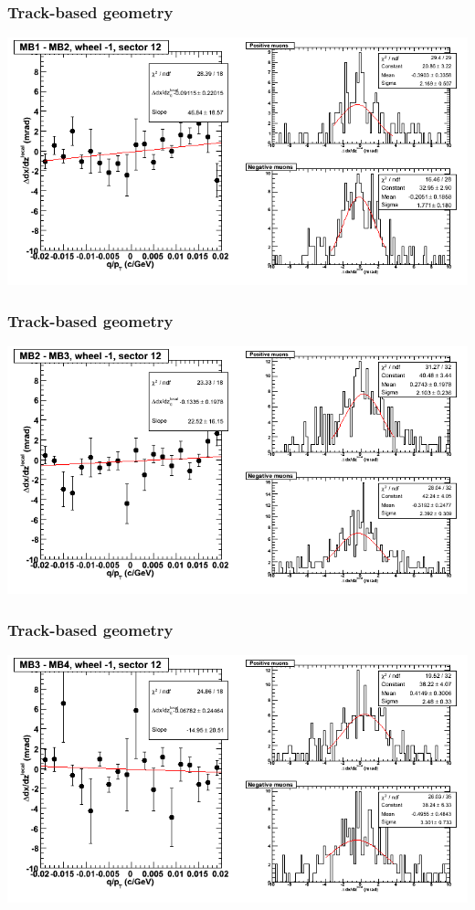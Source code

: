 \documentclass[compress]{beamer}
\begin{document}
\begin{frame}
\frametitle{Track-based geometry}
\includegraphics[width=\linewidth]{NOV4_segdiffs/dt13_slope_B_12_12.png}
\end{frame}

\begin{frame}
\frametitle{Track-based geometry}
\includegraphics[width=\linewidth]{NOV4_segdiffs/dt13_slope_B_12_23.png}
\end{frame}

\begin{frame}
\frametitle{Track-based geometry}
\includegraphics[width=\linewidth]{NOV4_segdiffs/dt13_slope_B_12_34.png}
\end{frame}
\end{document}
